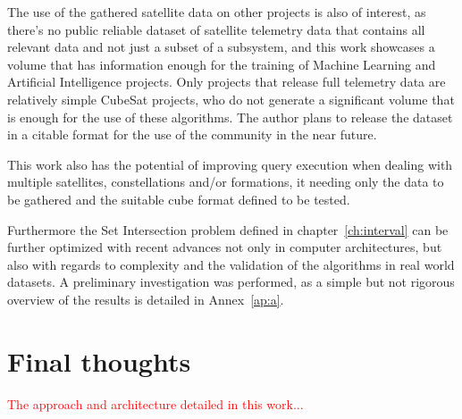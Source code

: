 The use of the gathered satellite data on other projects is also of interest, as there's no public reliable dataset of satellite telemetry data that contains all relevant data and not just a subset of a subsystem, and this work showcases a volume that has information enough for the training of Machine Learning and Artificial Intelligence projects.
Only projects that release full telemetry data are relatively simple CubeSat projects, who do not generate a significant volume that is enough for the use of these algorithms.
The author plans to release the dataset in a citable format for the use of the community in the near future.

This work also has the potential of improving query execution when dealing with multiple satellites, constellations and/or formations, it needing only the data to be gathered and the suitable cube format defined to be tested.

Furthermore the Set Intersection problem defined in chapter~\ref{ch:interval} can be further optimized with recent advances not only in computer architectures, but also with regards to complexity and the validation of the algorithms in real world datasets.
A preliminary investigation was performed, as a simple but not rigorous overview of the results is detailed in Annex~\ref{ap:a}.

\section{Final thoughts}\label{ch:concl:future}

\textcolor{red}{The approach and architecture detailed in this work...}

